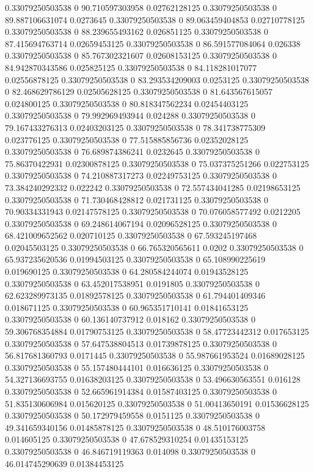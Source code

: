 0.33079250503538 0 90.710597303958 0.02762128125
0.33079250503538 0 89.887106631074 0.0273645
0.33079250503538 0 89.063459404853 0.02710778125
0.33079250503538 0 88.239655493162 0.026851125
0.33079250503538 0 87.415694763714 0.02659453125
0.33079250503538 0 86.591577084064 0.026338
0.33079250503538 0 85.767302321607 0.02608153125
0.33079250503538 0 84.942870343586 0.025825125
0.33079250503538 0 84.118281017077 0.02556878125
0.33079250503538 0 83.293534209003 0.0253125
0.33079250503538 0 82.468629786129 0.02505628125
0.33079250503538 0 81.643567615057 0.024800125
0.33079250503538 0 80.818347562234 0.02454403125
0.33079250503538 0 79.992969493944 0.024288
0.33079250503538 0 79.167433276313 0.02403203125
0.33079250503538 0 78.341738775309 0.023776125
0.33079250503538 0 77.515885856736 0.02352028125
0.33079250503538 0 76.689874386241 0.0232645
0.33079250503538 0 75.86370422931 0.02300878125
0.33079250503538 0 75.037375251266 0.022753125
0.33079250503538 0 74.210887317273 0.02249753125
0.33079250503538 0 73.384240292332 0.022242
0.33079250503538 0 72.557434041285 0.02198653125
0.33079250503538 0 71.730468428812 0.021731125
0.33079250503538 0 70.90334331943 0.02147578125
0.33079250503538 0 70.076058577492 0.0212205
0.33079250503538 0 69.248614067194 0.02096528125
0.33079250503538 0 68.421009652562 0.020710125
0.33079250503538 0 67.593245197468 0.02045503125
0.33079250503538 0 66.765320565611 0.0202
0.33079250503538 0 65.937235620536 0.01994503125
0.33079250503538 0 65.108990225619 0.019690125
0.33079250503538 0 64.280584244074 0.01943528125
0.33079250503538 0 63.452017538951 0.0191805
0.33079250503538 0 62.623289973135 0.01892578125
0.33079250503538 0 61.794401409346 0.018671125
0.33079250503538 0 60.965351710141 0.01841653125
0.33079250503538 0 60.136140737912 0.018162
0.33079250503538 0 59.306768354884 0.01790753125
0.33079250503538 0 58.47723442312 0.017653125
0.33079250503538 0 57.647538804513 0.01739878125
0.33079250503538 0 56.817681360793 0.0171445
0.33079250503538 0 55.987661953524 0.01689028125
0.33079250503538 0 55.157480444101 0.016636125
0.33079250503538 0 54.327136693755 0.01638203125
0.33079250503538 0 53.496630563551 0.016128
0.33079250503538 0 52.665961914384 0.01587403125
0.33079250503538 0 51.835130606984 0.015620125
0.33079250503538 0 51.00413650191 0.01536628125
0.33079250503538 0 50.172979459558 0.0151125
0.33079250503538 0 49.341659340156 0.01485878125
0.33079250503538 0 48.510176003758 0.014605125
0.33079250503538 0 47.678529310254 0.01435153125
0.33079250503538 0 46.846719119363 0.014098
0.33079250503538 0 46.014745290639 0.01384453125
